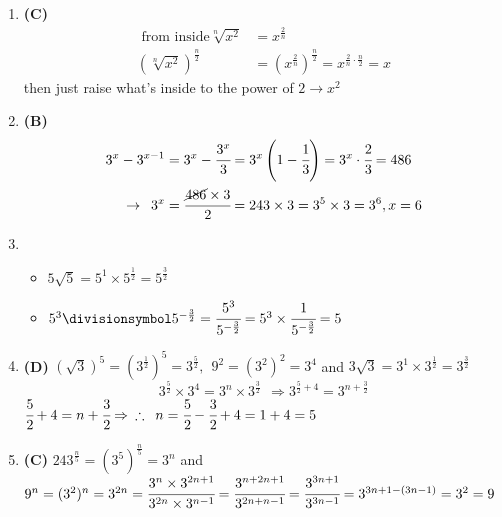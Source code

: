\begin{multicols}{2}
\begin{enumerate}[label={\arabic*.}]
    \item \textbf{(C)}
    \begin{align*} 
    \text{ from inside}  \sqrt[n]{x^2} &= x^{\frac{2}{n}} \\
    (\sqrt[n]{x^2})^{\frac{n}{2}} & = (x^{\frac{2}{n}})^{\frac{n}{2}} = x^{\frac{2}{n} \cdot \frac{n}{2}} = x 
    \end{align*}
    then just raise what's inside to the power of $2 \rightarrow x^2$
    \item \textbf{(B)} \begin{align*} 
        3^x - 3^{x-1} &= 3^x -\cfrac{3^x}{3} = 3^x\left(1- \cfrac{1}{3}\right) =3^x \cdot \cfrac{2}{3} =  486 \\ \rightarrow \hspace{5pt}  3^x &=  \cfrac{\cancel{486}\times 3}{2} = 243 \times 3 = 3^5 \times 3 = 3^6, x = 6
    \end{align*}
    \item
    \begin{itemize} 
    \item $5\sqrt{5} = 5^1 \times 5^{\frac{1}{2}} = 5^{\frac{3}{2}}$
    \item $5^3 \divisionsymbol 5^{-\frac{3}{2}} = \cfrac{5^3}{5^{-\frac{3}{2}}} = 5^3 \times \cfrac{1}{5^{-\frac{3}{2}}} = 5$
    \end{itemize}

    \item \textbf{(D)} $(\sqrt{3})^5 = (3^{\frac{1}{2}})^5 = 3^{\frac{5}{2}}, \hspace{5pt} 9^2 =(3^2)^2 = 3^4  $ and $3\sqrt{3} = 3^1 \times 3^{\frac{1}{2}} = 3^{\frac{3}{2}}$ \\
        $$3^{\frac{5}{2}} \times 3^4 = 3^n \times 3^{\frac{3}{2}}\hspace{5pt} \Rightarrow 3^{\frac{5}{2} + 4} = 3^{n + \frac{3}{2}} $$ 
        $ \cfrac{5}{2} + 4 = n + \cfrac{3}{2} \Rightarrow \hspace{5pt} \therefore \hspace{5pt} n = \cfrac{5}{2} - \cfrac{3}{2} + 4 = 1 + 4 = 5  $
    \item \textbf{(C)} $243^{\frac{n}{5}} = (3^5)^{\frac{n}{5}} = 3^n$ and $9^n = (3^2)^n = 3^{2n} = \cfrac{3^n \times 3^{2n + 1}}{3^{2n} \times 3^{n-1}} = \cfrac{3^{n + 2n + 1}}{3^{2n + n -1}} = \cfrac{3^{3n + 1}}{3^{3n - 1}} = 3^{3n + 1 - (3n - 1)} = 3^2 = 9 $


\end{enumerate}
\end{multicols}
